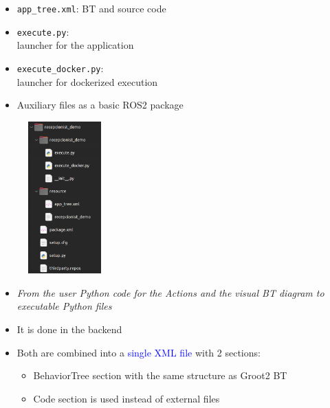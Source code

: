\documentclass[notes,slidesec,a4]{seminar}
\begin{document}
\begin{hslide}
\newpage
{}
  \begin{minipage}[t]{7cm}
	\vspace{1cm}
  	\begin{itemize}
	  	\item \texttt{app\_tree.xml}: BT and source code
		\item \texttt{execute.py}:\\launcher for the application
		\item \texttt{execute\_docker.py}:\\ launcher for dockerized execution
		\item Auxiliary files as a basic ROS2 package
	\end{itemize}
  \end{minipage}
  \begin{minipage}[t]{5cm}
  	\begin{figure}
  		\centerline{\includegraphics[width=2.8cm]{figs/package-struct.png}}
  	\end{figure}
  \end{minipage}


\newpage
 \begin{itemize}
 \item \textit{From the user Python code for the Actions and the visual BT diagram to executable Python files}
 \item It is done in the backend
 \item Both are combined into a \textcolor{blue}{single XML file} with 2 sections:
   \begin{itemize}
 \item BehaviorTree section with the same structure as Groot2 BT
 \item Code section is used instead of external files
   \end{itemize}
 \end{itemize}  
\end{hslide}
\end{document}
